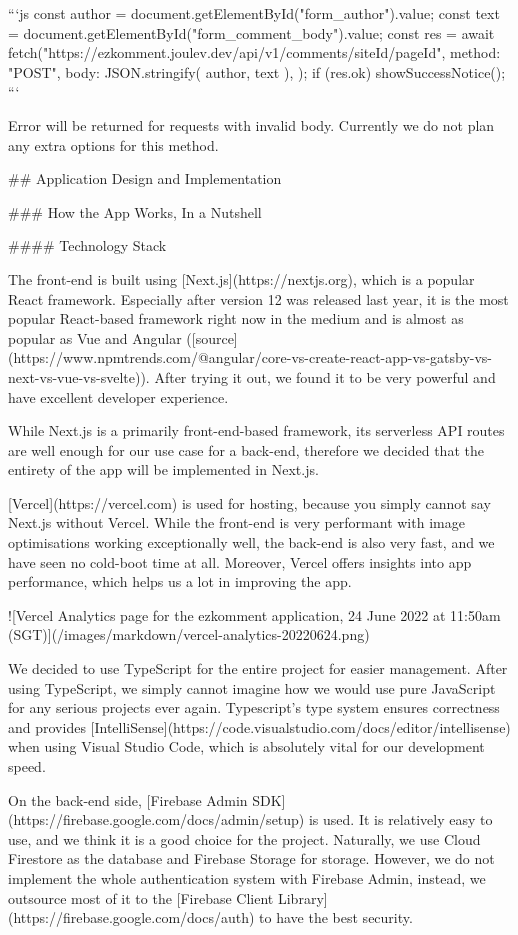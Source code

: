 \documentclass[11pt]{article}
\begin{document}
\begin{markdown}
```js
const author = document.getElementById("form_author").value;
const text = document.getElementById("form_comment_body").value;
const res = await fetch("https://ezkomment.joulev.dev/api/v1/comments/siteId/pageId", {
  method: "POST",
  body: JSON.stringify({ author, text }),
});
if (res.ok) showSuccessNotice();
```

Error will be returned for requests with invalid body. Currently we do not plan any extra options for this method.

## Application Design and Implementation

### How the App Works, In a Nutshell

#### Technology Stack

The front-end is built using [Next.js](https://nextjs.org), which is a popular React framework. Especially after version 12 was released last year, it is the most popular React-based framework right now in the medium and is almost as popular as Vue and Angular ([source](https://www.npmtrends.com/@angular/core-vs-create-react-app-vs-gatsby-vs-next-vs-vue-vs-svelte)). After trying it out, we found it to be very powerful and have excellent developer experience.

While Next.js is a primarily front-end-based framework, its serverless API routes are well enough for our use case for a back-end, therefore we decided that the entirety of the app will be implemented in Next.js.

[Vercel](https://vercel.com) is used for hosting, because you simply cannot say Next.js without Vercel. While the front-end is very performant with image optimisations working exceptionally well, the back-end is also very fast, and we have seen no cold-boot time at all. Moreover, Vercel offers insights into app performance, which helps us a lot in improving the app.

![Vercel Analytics page for the ezkomment application, 24 June 2022 at 11:50am (SGT)](/images/markdown/vercel-analytics-20220624.png)

We decided to use TypeScript for the entire project for easier management. After using TypeScript, we simply cannot imagine how we would use pure JavaScript for any serious projects ever again. Typescript's type system ensures correctness and provides [IntelliSense](https://code.visualstudio.com/docs/editor/intellisense) when using Visual Studio Code, which is absolutely vital for our development speed.

On the back-end side, [Firebase Admin SDK](https://firebase.google.com/docs/admin/setup) is used. It is relatively easy to use, and we think it is a good choice for the project. Naturally, we use Cloud Firestore as the database and Firebase Storage for storage. However, we do not implement the whole authentication system with Firebase Admin, instead, we outsource most of it to the [Firebase Client Library](https://firebase.google.com/docs/auth) to have the best security.


\end{markdown}
\end{document}
